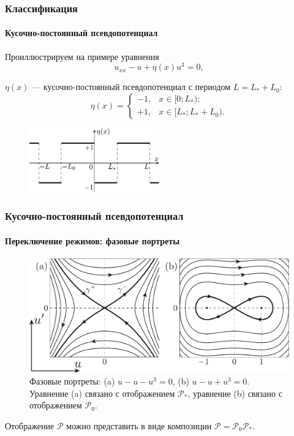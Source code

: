 \documentclass [10pt] {beamer}
\begin{document}
\begin{frame}
	\frametitle{Классификация}
	\framesubtitle{Кусочно-постоянный псевдопотенциал}
	
	Проиллюстрируем на примере уравнения
	\begin{equation}
		u_{xx} - u + \eta(x) u^3 = 0,
		\label{eq:piecewise}
	\end{equation}
	
	$\eta(x)$ --- кусочно-постоянный псевдопотенциал с периодом $L = L_* + L_0$:
	\begin{equation*}
		\eta(x) = \left\{
			\begin{array}{rl}
				-1, &  x \in [0; L_*); \\[1.5mm]
				+1, & x \in [L_*; L_* + L_0).
			\end{array}
		\right.
	\end{equation*}
	
	\begin{figure}
		\includegraphics[width = 0.5\textwidth]{pic/piecewise constant.pdf}
	\end{figure}
\end{frame}

\begin{frame}
	\frametitle{Кусочно-постоянный псевдопотенциал}
	\framesubtitle{Переключение режимов: фазовые портреты}
	
	\begin{figure}
		\includegraphics[width = \textwidth]{pic/phase portraits.pdf}
		\caption{Фазовые портреты: (a) $u - u - u^3 = 0$, (b) $u - u + u^3 = 0$. Уравнение (a) связано с отображением $\mathcal{P}_*$, уравнение (b) связано с отображением $\mathcal{P}_0$.}
	\end{figure}
	
	\begin{center}
		Отображение $\mathcal{P}$ можно представить в виде композиции $\mathcal{P} = \mathcal{P}_0 \mathcal{P}_*$.
	\end{center}
\end{frame}
\end{document}

